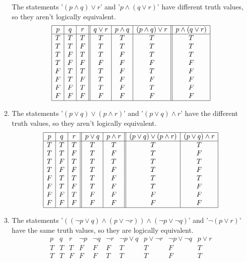 \documentclass{article}
\begin{document}
\begin{enumerate}[label=\textbf{\arabic*.}]
The statements '$(p \land q) \lor r$' and '$p \land (q \lor r)$' have different truth values, so they aren't logically equivalent.
\[
\begin{array}{|c|c|c||c|c|c||c|c|}
\hline
p & q & r & q \lor r & p \land q & (p \land q) \lor r & p \land (q \lor r) \\
\hline
T & T & T & T & T & T & T \\
T & T & F & T & T & T & T \\
T & F & T & T & F & T & T \\
T & F & F & F & F & F & F \\
F & T & T & T & F & T & F \\
F & T & F & T & F & F & F \\
F & F & T & T & F & T & F \\
F & F & F & F & F & F & F \\
\hline 
\end{array}
\]
\item %
The statements '$(p \lor q) \lor (p \land r)$' and '$(p \lor q) \land r$' have the different truth values, so they aren't logically equivalent.
\[
\begin{array}{|c|c|c||c|c||c|c|}
\hline
p & q & r & p \lor q & p \land r & (p \lor q) \lor (p \land r) & (p \lor q) \land r\\
\hline
T & T & T & T & T & T & T \\
T & T & F & T & F & T & F \\
T & F & T & T & T & T & T \\
T & F & F & T & F & T & F \\
F & T & T & T & F & T & T \\
F & T & F & T & F & T & F \\
F & F & T & F & F & F & F \\
F & F & F & F & F & F & F \\
\hline 
\end{array}
\]
\item %
The statements '$((\neg p \lor q) \land (p \lor \neg r)) \land (\neg p \lor \neg q)$' and '$\neg (p \lor r)$' have the same truth values, so they are logically equivalent.
\[
\begin{array}{|c|c|c||c|c|c||c|c|c||c|c||c|}
\hline
p & q & r & \neg p & \neg q & \neg r & \neg p \lor q & p \lor \neg r & \neg p \lor \neg q & p \lor r\\
\hline
T & T & T & F & F & F & T & T & F & T \\
T & T & F & F & F & T & T & T & F & T \\

\end{array}\]
\end{enumerate}
\end{document}
